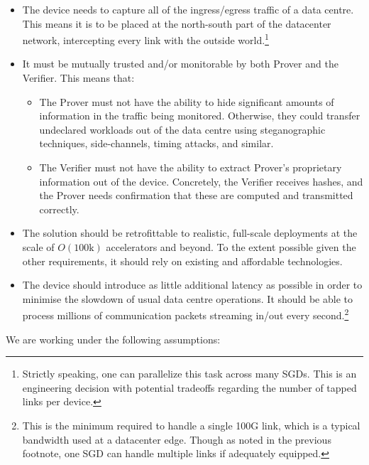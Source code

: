 \documentclass{article}
\begin{document}
\begin{itemize}
\item The device needs to capture all of the ingress/egress traffic of a data centre. This means it is to be placed at the north-south part of the datacenter network, intercepting every link with the outside world.\footnote{Strictly speaking, one can parallelize this task across many SGDs. This is an engineering decision with potential tradeoffs regarding the number of tapped links per device.}

\item It must be mutually trusted and/or monitorable by both Prover and the Verifier. This means that:
\begin{itemize}
\item The Prover must not have the ability to hide significant amounts of information in the traffic being monitored. Otherwise, they could transfer undeclared workloads out of the data centre using steganographic techniques, side-channels, timing attacks, and similar.
\item The Verifier must not have the ability to extract Prover's proprietary information out of the device. Concretely, the Verifier receives hashes, and the Prover needs confirmation that these are computed and transmitted correctly.
\end{itemize}

\item The solution should be retrofittable to realistic, full-scale deployments at the scale of $O(100\text{k})$ accelerators and beyond. To the extent possible given the other requirements, it should rely on existing and affordable technologies.

\item The device should introduce as little additional latency as possible in order to minimise the slowdown of usual data centre operations. It should be able to process millions of communication packets streaming in/out every second.\footnote{This is the minimum required to handle a single 100G link, which is a typical bandwidth used at a datacenter edge. Though as noted in the previous footnote, one SGD can handle multiple links if adequately equipped.}
\end{itemize}

We are working under the following assumptions:
\end{document}
